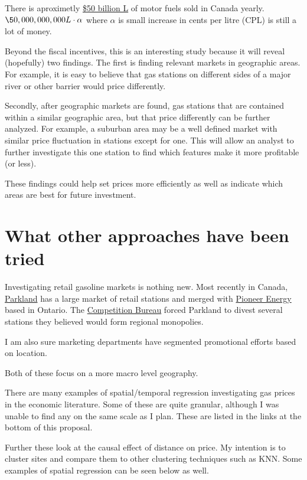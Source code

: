 \documentclass[11pt]{article}
\begin{document}
There is aproximetly \href{https://www150.statcan.gc.ca/t1/tbl1/en/tv.action?pid=2310006601}{\$50 billion L} of motor fuels sold in Canada yearly.
\(\50,000,000,000L \cdot \alpha\) where \(\alpha\) is small increase in cents per
litre (CPL) is still a lot of money. 

Beyond the fiscal incentives, this is an interesting study because it will
reveal (hopefully) two findings. The first is finding relevant markets in
geographic areas. For example, it is easy to believe that gas stations on
different sides of a major river or other barrier would price differently.

Secondly, after geographic markets are found, gas stations that are contained
within a similar geographic area, but that price differently can be further
analyzed. For example, a suburban area may be a well defined market with similar
price fluctuation in stations except for one. This will allow an analyst to
further investigate this one station to find which features make it more
profitable (or less).

These findings could help set prices more efficiently as well as indicate which
areas are best for future investment. 


\section{What other approaches have been tried}
\label{sec:org11599b1}

Investigating retail gasoline markets is nothing new. Most recently in Canada,
\href{https://www.parkland.ca/en/our-businesses/retail/}{Parkland} has a large market of retail stations and merged with \href{https://en.wikipedia.org/wiki/Pioneer\_Energy}{Pioneer Energy}
based in Ontario.  The \href{http://www.competitionbureau.gc.ca/eic/site/cb-bc.nsf/eng/04053.html}{Competition Bureau} forced Parkland to divest several
stations they believed would form regional monopolies.

I am also sure marketing departments have segmented promotional efforts based on
location.

Both of these focus on a more macro level geography.

There are many examples of spatial/temporal regression investigating gas prices
in the economic literature. Some of these are quite granular, although I was
unable to find any on the same scale as I plan. These are listed in the links
at the bottom of this proposal.

Further these look at the causal effect of distance on price. My intention is to
cluster sites and compare them to other clustering techniques such as
KNN. Some examples of spatial regression can be seen below as well.
\end{document}
